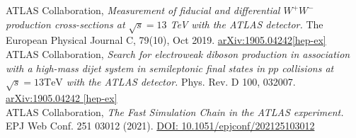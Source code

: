 ATLAS Collaboration, {\it Measurement of fiducial and differential $W^+W^-$ production cross-sections
at $\sqrt{s}=13$ TeV with the ATLAS detector.}  The European Physical Journal
C, 79(10), Oct 2019. \href{https://arxiv.org/abs/1905.04242}{arXiv:1905.04242[hep-ex]}
\\
ATLAS Collaboration, {\it Search for electroweak diboson production in association with a high-mass dijet system in semileptonic final states in $pp$ collisions at $\sqrt{s}=13 \mathrm{TeV}$ with the ATLAS detector.} Phys. Rev. D 100, 032007. \href{https://arxiv.org/abs/1905.07714}{arXiv:1905.04242 [hep-ex]} 
\\
ATLAS Collaboration, {\it The Fast Simulation Chain in the ATLAS experiment.} EPJ Web Conf. 251 03012 (2021). \href{https://www.epj-conferences.org/articles/epjconf/abs/2021/05/epjconf_chep2021_03012/epjconf_chep2021_03012.html}{DOI: 10.1051/epjconf/202125103012}
